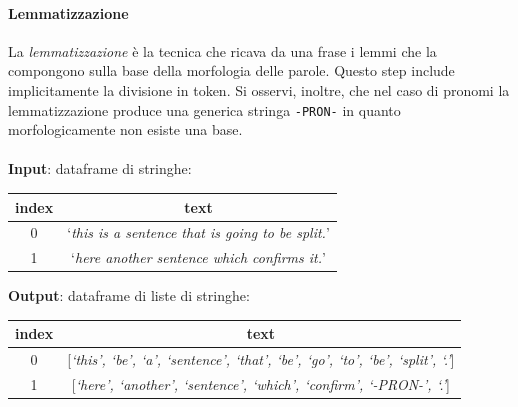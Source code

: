 \documentclass[12pt]{report}
\theoremstyle{definition}
\begin{document}
\paragraph{Lemmatizzazione}
La \textit{lemmatizzazione} è la tecnica che ricava da una frase i lemmi che la compongono sulla base della morfologia delle parole.
Questo step include implicitamente la divisione in token.
Si osservi, inoltre, che nel caso di pronomi la lemmatizzazione produce una generica stringa \texttt{-PRON-} in quanto morfologicamente non esiste una base.
\\
\\
\textbf{Input}: dataframe di stringhe:
\begin{center}
    \begin{tabular}{|c|c|}
    \hline
    \textbf{index} & \textbf{text} \\
    \hline
         0 & `\textit{this is a sentence that is going to be split.}'\\
         1 & `\textit{here another sentence which confirms it.}'\\
    \hline
    \end{tabular}
\end{center}
\textbf{Output}: dataframe di liste di stringhe:
\begin{center}
    \begin{tabular}{|c|c|}
    \hline
    \textbf{index} & \textbf{text} \\
    \hline
         0 & [\textit{`this', `be', `a', `sentence', `that', `be', `go', `to', `be', `split', `.'}]\\
         1 & [\textit{`here', `another', `sentence', `which', `confirm', `-PRON-', `.'}]\\
    \hline
    \end{tabular}
\end{center}
\end{document}
